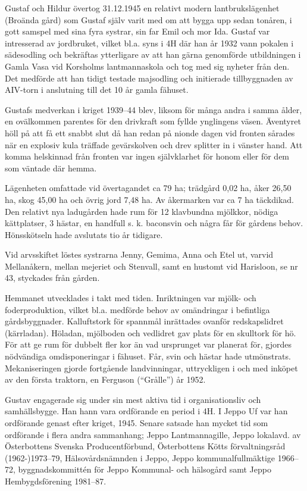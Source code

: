 Gustaf och Hildur övertog 31.12.1945 en relativt modern lantbrukslägenhet (Broända gård) som Gustaf själv varit med om att bygga upp sedan tonåren, i gott samspel med sina fyra systrar, sin far Emil och mor Ida. Gustaf var intresserad av jordbruket, vilket bl.a. syns i 4H där han år 1932 vann pokalen i sädesodling och bekräftas ytterligare av att han gärna genomförde utbildningen i Gamla Vasa vid 	Korsholms lantmannaskola och tog med sig nyheter från den. Det medförde att han tidigt testade majsodling och initierade tillbyggnaden av AIV-torn i anslutning till det 10 år gamla fähuset.

Gustafs medverkan i kriget 1939--44 blev, liksom för många andra i samma ålder, en ovälkommen parentes för den drivkraft som fyllde ynglingens väsen. Äventyret höll på att få ett snabbt slut då han redan på nionde dagen vid fronten sårades när en explosiv kula träffade gevärskolven och drev splitter in i vänster hand. Att komma helskinnad från fronten var ingen självklarhet för honom eller för dem som väntade där hemma.

Lägenheten omfattade vid övertagandet ca 79 ha; trädgård 0,02 ha, åker 26,50 ha, skog 45,00 ha och övrig jord 7,48 ha. Av åkermarken var ca 7 ha täckdikad. Den relativt nya ladugården hade rum för 12 klavbundna mjölkkor, nödiga kättplatser, 3 hästar, en handfull s. k. baconsvin och några får för gårdens behov. Hönsskötseln hade avslutats tio år tidigare.

Vid arvsskiftet löstes systrarna Jenny, Gemima, Anna och Etel ut, varvid Mellanåkern, mellan mejeriet och Stenvall, samt en hustomt vid Harisloon, se nr 43, styckades från gården.

Hemmanet utvecklades i takt med tiden. Inriktningen var mjölk- och foderproduktion, vilket bl.a. medförde behov av omändringar i befintliga gårdsbyggnader. Kalluftstork för spannmål inrättades ovanför redskapslidret (kärrladan). Höladan, mjölboden och vedlidret gav plats för en skulltork för hö. För att ge rum för dubbelt fler kor än vad ursprunget var planerat för, gjordes nödvändiga omdisponeringar i fähuset. Får, svin och hästar hade utmönstrats. Mekaniseringen gjorde fortgående landvinningar, uttryckligen i och med inköpet av den första traktorn, en Ferguson (``Grålle'') år 1952.

Gustav engagerade sig under sin mest aktiva tid i organisationsliv och 	samhällsbygge. Han hann vara ordförande en period i 4H. I Jeppo Uf var han ordförande genast efter kriget, 1945. Senare satsade han mycket tid som ordförande i flera andra sammanhang; Jeppo Lantmannagille, Jeppo lokalavd. av Österbottens Svenska Producentförbund, Österbottens Kötts förvaltningsråd (1962-)1973--79, Hälsovårdsnämnden i Jeppo, Jeppo kommunalfullmäktige 1966--72, byggnadskommittén för Jeppo Kommunal- och hälsogård samt Jeppo Hembygdsförening 1981--87.

